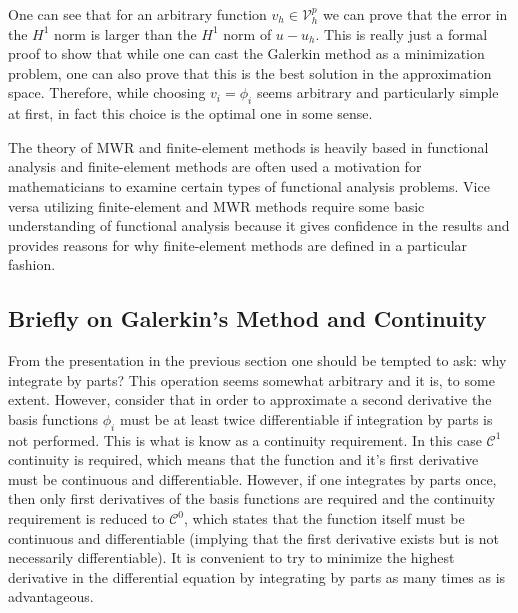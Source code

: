 One can see that for an arbitrary function $v_{h} \in \mathcal{V}_{h}^{p}$  we can prove that the error in the $H^{1}$ norm is larger than the $H^{1}$ norm of $u - u_{h}$.  This is really just a formal proof to show that while one can cast the Galerkin method as a minimization problem, one can also prove that this is the best solution in the approximation space.  Therefore, while choosing $v_{i} = \phi_{i}$ seems arbitrary and particularly simple at first, in fact this choice is the optimal one in some sense.  

The theory of MWR and finite-element methods is heavily based in functional analysis and finite-element methods are often used a motivation for mathematicians to examine certain types of functional analysis problems.  Vice versa utilizing finite-element and MWR methods require some basic understanding of functional analysis because it gives confidence in the results and provides reasons for why finite-element methods are defined in a particular fashion. 

\subsection{Briefly on Galerkin's Method and Continuity}
From the presentation in the previous section one should be tempted to ask: why integrate by parts?  This operation seems somewhat arbitrary and it is, to some extent.  However, consider that in order to approximate a second derivative the basis functions $\phi_{i}$ must be at least twice differentiable if integration by parts is not performed.
This is what is know as a continuity requirement.  In this case $\mathcal{C}^{1}$ continuity is required, which means that the function and it's first derivative must be continuous and differentiable.  However, if one integrates by parts once, then only first derivatives of the basis functions are required and the continuity requirement is reduced to $\mathcal{C}^{0}$, which states that the function itself must be continuous and differentiable (implying that the first derivative exists but is not necessarily differentiable).    It is convenient to try to minimize the highest derivative in the differential equation  by integrating by parts as many times as is advantageous.       

